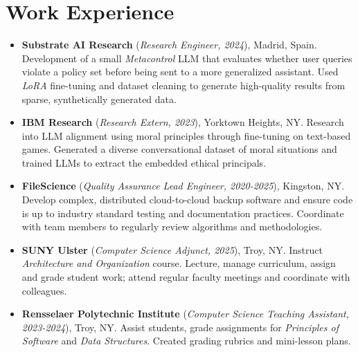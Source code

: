 \documentclass[11pt]{article}
\begin{document}
\section*{Work Experience}
\begin{itemize}
    \itemsep0em
    
    \item \textbf{Substrate AI Research} (\textit{Research Engineer, 2024}), Madrid, Spain. Development of a small \textit{Metacontrol} LLM that evaluates whether user queries violate a policy set before being sent to a more generalized assistant.  Used \textit{LoRA} fine-tuning and dataset cleaning to generate high-quality results from sparse, synthetically generated data.

    \item \textbf{IBM Research} (\textit{Research Extern, 2023}), Yorktown Heights, NY. Research into LLM alignment using moral principles through fine-tuning on text-based games. Generated a diverse conversational dataset of moral situations and trained LLMs to extract the embedded ethical principals.
    
    \item \textbf{FileScience} (\textit{Quality Assurance Lead Engineer, 2020-2025}), Kingston, NY. Develop complex, distributed cloud-to-cloud backup software and ensure code is up to industry standard testing and documentation practices.  Coordinate with team members to regularly review algorithms and methodologies.
    
    \item \textbf{SUNY Ulster} (\textit{Computer Science Adjunct, 2025}), Troy, NY. Instruct \textit{Architecture and Organization} course.  Lecture, manage curriculum, assign and grade student work; attend regular faculty meetings and coordinate with colleagues.
    
    \item \textbf{Rensselaer Polytechnic Institute} (\textit{Computer Science Teaching Assistant, 2023-2024}), Troy, NY. Assist students, grade assignments for \textit{Principles of Software} and \textit{Data Structures}. Created grading rubrics and mini-lesson plans.

\end{itemize}
\end{document}
